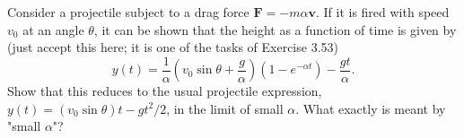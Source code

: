 Consider a projectile subject to a drag force $\mathbf{F} = -m\alpha \mathbf{v}$. If it is fired with speed $v_0$ at an angle $\theta$, it can be shown that the height as a function of time is given by (just accept this here; it is one of the tasks of Exercise 3.53) \begin{equation} y(t) = \frac{1}{\alpha}\left(v_0 \sin\theta + \frac{g}{\alpha}\right)\left(1 - e^{-\alpha t}\right) - \frac{gt}{\alpha}. \tag{1.19} \end{equation} Show that this reduces to the usual projectile expression, $y(t) = (v_0 \sin\theta)t - gt^2/2$, in the limit of small $\alpha$. What exactly is meant by "small $\alpha$"?